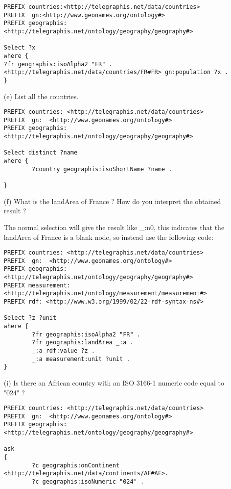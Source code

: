 \documentclass[a4paper, 12pt]{report}
\begin{document}
\begin{enumerate}
\begin{lstlisting}[frame=single]
PREFIX countries:<http://telegraphis.net/data/countries>
PREFIX  gn:<http://www.geonames.org/ontology#>
PREFIX geographis:<http://telegraphis.net/ontology/geography/geography#>

Select ?x
where {
?fr geographis:isoAlpha2 "FR" .
<http://telegraphis.net/data/countries/FR#FR> gn:population ?x .
}
\end{lstlisting}
\item[(e)] List all the countries. 
\begin{lstlisting}[frame=single]
PREFIX countries: <http://telegraphis.net/data/countries>
PREFIX  gn:  <http://www.geonames.org/ontology#>
PREFIX geographis:  <http://telegraphis.net/ontology/geography/geography#>

Select distinct ?name
where {
        ?country geographis:isoShortName ?name .

}
\end{lstlisting}

\item[(f)] What is the landArea of France ? How do you interpret the obtained result ? 

    The normal selection will give the result like \_:n0, this indicates that the landArea of France is a blank node, so instead use the following code:
\begin{lstlisting}[frame=single]
PREFIX countries: <http://telegraphis.net/data/countries>
PREFIX  gn:  <http://www.geonames.org/ontology#>
PREFIX geographis:  <http://telegraphis.net/ontology/geography/geography#>
PREFIX measurement: <http://telegraphis.net/ontology/measurement/measurement#>
PREFIX rdf: <http://www.w3.org/1999/02/22-rdf-syntax-ns#>

Select ?z ?unit
where {
        ?fr geographis:isoAlpha2 "FR" .
        ?fr geographis:landArea _:a .
        _:a rdf:value ?z .
        _:a measurement:unit ?unit .
}

\end{lstlisting}

\item[(i)] Is there an African country with an ISO 3166-1 numeric code equal to "024" ?
\begin{lstlisting}[frame=single]
PREFIX countries: <http://telegraphis.net/data/countries>
PREFIX  gn:  <http://www.geonames.org/ontology#>
PREFIX geographis:  <http://telegraphis.net/ontology/geography/geography#>

ask
{
        ?c geographis:onContinent <http://telegraphis.net/data/continents/AF#AF>.
        ?c geographis:isoNumeric "024" .


\end{lstlisting}
\end{enumerate}
\end{document}

